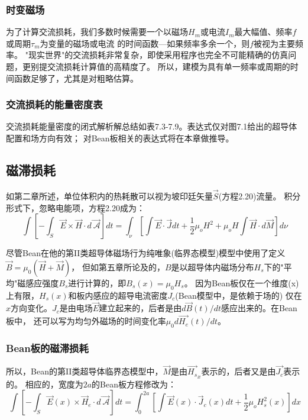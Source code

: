 \subsubsection*{时变磁场}
为了计算交流损耗，我们多数时候需要一个以磁场$H_m$或电流$I_m$最大幅值、频率$f$或周期$\tau_m$为变量的磁场或电流
的时间函数---如果频率多余一个，则$f$被视为主要频率。
"现实世界"的交流损耗非常复杂，即使采用程序也完全不可能精确的仿真问题，更别提交流损耗计算值的高精度了。
所以，建模为具有单一频率或周期的时间函数足够了，尤其是对粗略估算。

\subsubsection*{交流损耗的能量密度表}
交流损耗能量密度的闭式解析解总结如表7.3-7.9。表达式仅对图7.1给出的超导体配置和场方向有效；
对Bean板相关的表达式将在本章做推导。

\subsection{磁滞损耗}
如第二章所述，单位体积内的热耗散可以视为坡印廷矢量$\vec{S}$(方程2.20)流量。
积分形式下，忽略电能项，方程2.20成为：
\begin{equation}%
\int\left[-\int_{S}^{}\vec{E}\times\vec{H}\cdot d\vec{\ \mathcal{A}}\right]dt=\int_{\nu}^{}\left[\int\vec{E}\cdot\vec{J}dt+\frac{1}{2}\mu_oH^2+\mu_oH\int\vec{H}\cdot d\vec{M}\right]d\nu
\end{equation}

尽管Bean在他的第II类超导体磁场行为纯唯象(临界态模型)模型中使用了定义$\vec{B}=\mu_0(\vec{H}+\vec{M})$，
但如第五章所论及的，$B$是以超导体内磁场分布$H_s$下的"平均"磁感应强度$B_s$进行计算的，即$B_s(x)=\mu_0 H_s$。
因为Bean板仅在一个维度(x)上有限，$H_s(x)$和板内感应的超导电流密度$J_c$(Bean模型中，是依赖于场的)
仅在$x$方向变化。$J_c$是由电场$\vec{E}$建立起来的，后者是由$d\vec{B}(t)/dt$感应出来的。在Bean板中，
还可以写为均匀外磁场的时间变化率$\mu_0 d\vec{H_e}(t)/dt$。

\subsubsection*{Bean板的磁滞损耗}
所以，Bean的第II类超导体临界态模型中，$\vec{M}$是由$\vec{H_s}_x$表示的，后者又是由$\vec{J_c}$表示的。
相应的，宽度为$2a$的Bean板方程修改为：
\begin{equation}%
\int\left[-\int_{S}\vec{E}(x)\times\vec{H}_e\cdot d\vec{\ \mathcal{A}}\right]dt=\int_{0}^{2a}\left[\int\vec{E}(x)\cdot\vec{J}_c(x)dt+\frac{1}{2}\mu_oH_{s}^{2}(x)\right]dx
\end{equation}

